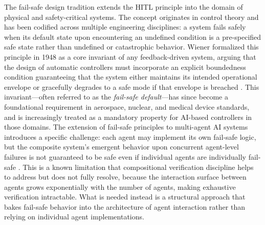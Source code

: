 The fail-safe design tradition extends the HITL principle into the domain of physical and safety-critical systems. The concept originates in control theory and has been codified across multiple engineering disciplines: a system fails safely when its default state upon encountering an undefined condition is a pre-specified safe state rather than undefined or catastrophic behavior. Wiener formalized this principle in 1948 as a core invariant of any feedback-driven system, arguing that the design of automatic controllers must incorporate an explicit boundedness condition guaranteeing that the system either maintains its intended operational envelope or gracefully degrades to a safe mode if that envelope is breached \cite{wiener1948}. This invariant—often referred to as the \emph{fail-safe default}—has since become a foundational requirement in aerospace, nuclear, and medical device standards, and is increasingly treated as a mandatory property for AI-based controllers in those domains. The extension of fail-safe principles to multi-agent AI systems introduces a specific challenge: each agent may implement its own fail-safe logic, but the composite system's emergent behavior upon concurrent agent-level failures is not guaranteed to be safe even if individual agents are individually fail-safe \cite{dijkstra1982}. This is a known limitation that compositional verification discipline helps to address but does not fully resolve, because the interaction surface between agents grows exponentially with the number of agents, making exhaustive verification intractable. What is needed instead is a structural approach that bakes fail-safe behavior into the architecture of agent interaction rather than relying on individual agent implementations.

